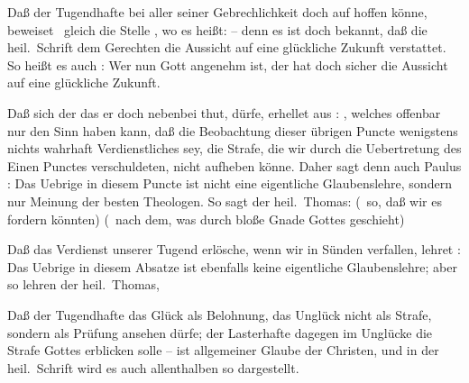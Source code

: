 \begin{aufza}
\item Daß der Tugendhafte bei aller seiner Gebrechlichkeit doch auf  hoffen könne, beweiset \zB\ gleich die Stelle , wo es heißt:  -- denn es ist doch bekannt, daß die heil.\ Schrift dem Gerechten die Aussicht auf eine glückliche Zukunft verstattet. So heißt es auch :  Wer nun Gott angenehm ist, der hat doch sicher die Aussicht auf eine glückliche Zukunft.
\item Daß sich der  das er doch nebenbei thut,  dürfe, erhellet aus : , welches offenbar nur den Sinn haben kann, daß die Beobachtung dieser übrigen Puncte wenigstens nichts wahrhaft Verdienstliches sey, die Strafe, die wir durch die Uebertretung des Einen Punctes verschuldeten, nicht aufheben könne. Daher sagt denn auch Paulus :  Das Uebrige in diesem Puncte ist nicht eine eigentliche Glaubenslehre, sondern nur Meinung der besten Theologen. So sagt der heil.\ Thomas:  (\dh\ so, daß wir es fordern könnten)  (\dh\ nach dem, was durch bloße Gnade Gottes geschieht) 
\item Daß das Verdienst unserer Tugend erlösche, wenn wir in Sünden verfallen, lehret :  Das Uebrige in diesem Absatze ist ebenfalls keine eigentliche Glaubenslehre; aber so lehren der heil.\ Thomas, \uA
\item Daß der Tugendhafte das Glück als Belohnung, das Unglück nicht als Strafe, sondern als Prüfung ansehen dürfe; der Lasterhafte dagegen im Unglücke die Strafe Gottes erblicken solle -- ist allgemeiner Glaube der Christen, und in der heil.\ Schrift wird es auch allenthalben so dargestellt.
\end{aufza}

